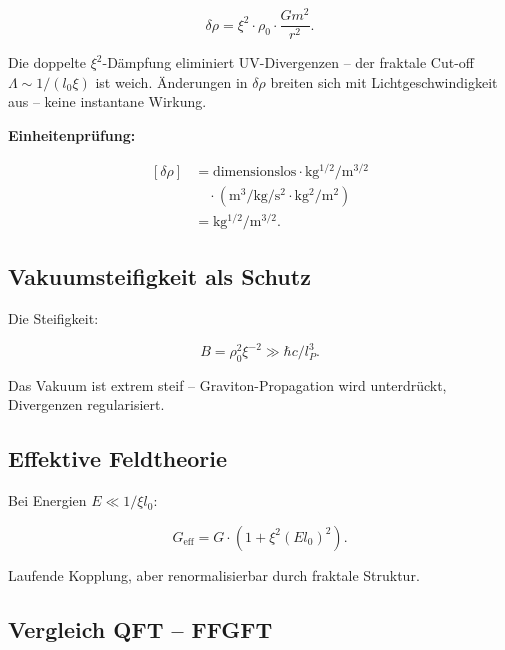 	\begin{equation}
		\delta \rho = \xi^2 \cdot \rho_0 \cdot \frac{G m^2}{r^2}.
	\end{equation}
	
	Die doppelte \(\xi^2\)-Dämpfung eliminiert UV-Divergenzen – der fraktale Cut-off \(\Lambda \sim 1/(l_0 \xi)\) ist weich. Änderungen in \(\delta \rho\) breiten sich mit Lichtgeschwindigkeit aus – keine instantane Wirkung.
	
	\textbf{Einheitenprüfung:}

\[
\begin{aligned}
	[\delta \rho]
	&= \text{dimensionslos}
	\cdot \si{\kilo\gram^{1/2}\per\meter^{3/2}} \\
	&\quad \cdot
	\left(
	\si{\meter\cubed\per\kilo\gram\per\second\squared}
	\cdot \si{\kilo\gram^2}
	\big/ \si{\meter^2}
	\right) \\
	&= \si{\kilo\gram^{1/2}\per\meter^{3/2}}.
\end{aligned}
\]
	
	\subsection*{Vakuumsteifigkeit als Schutz}
	
	Die Steifigkeit:
	
	\begin{equation}
		B = \rho_0^2 \xi^{-2} \gg \hbar c / l_P^3.
	\end{equation}
	
	Das Vakuum ist extrem steif – Graviton-Propagation wird unterdrückt, Divergenzen regularisiert.
	
	\subsection*{Effektive Feldtheorie}
	
	Bei Energien \(E \ll 1/\xi l_0\):
	
	\begin{equation}
		G_{\text{eff}} = G \cdot (1 + \xi^2 (E l_0)^2).
	\end{equation}
	
	Laufende Kopplung, aber renormalisierbar durch fraktale Struktur.
	
	\subsection*{Vergleich QFT – FFGFT}
	
